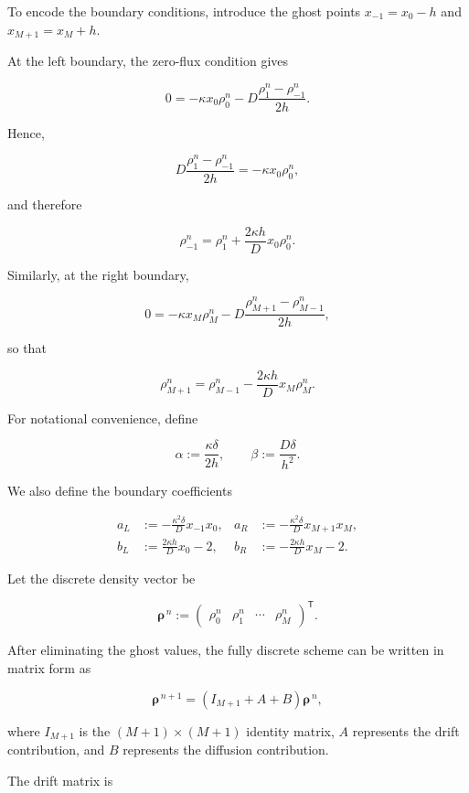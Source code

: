 \documentclass{article}
\begin{document}
To encode the boundary conditions, introduce the ghost points
$x_{-1}=x_0-h$ and $x_{M+1}=x_M+h$.

At the left boundary, the zero-flux condition gives

$$
0
=
-\kappa x_0\rho_0^n
-
D\frac{\rho_1^n-\rho_{-1}^n}{2h}.
$$

Hence,

$$
D\frac{\rho_1^n-\rho_{-1}^n}{2h}
=
-\kappa x_0\rho_0^n,
$$

and therefore

$$
\rho_{-1}^n
=
\rho_1^n
+
\frac{2\kappa h}{D}x_0\rho_0^n.
$$

Similarly, at the right boundary,

$$
0
=
-\kappa x_M\rho_M^n
-
D\frac{\rho_{M+1}^n-\rho_{M-1}^n}{2h},
$$

so that

$$
\rho_{M+1}^n
=
\rho_{M-1}^n
-
\frac{2\kappa h}{D}x_M\rho_M^n.
$$

For notational convenience, define

$$
\alpha
:=
\frac{\kappa\delta}{2h},
\qquad
\beta
:=
\frac{D\delta}{h^2}.
$$

We also define the boundary coefficients

$$
\begin{aligned}
a_L
&:=
-\frac{\kappa^2\delta}{D}x_{-1}x_0,
&
a_R
&:=
-\frac{\kappa^2\delta}{D}x_{M+1}x_M,
\\[6pt]
b_L
&:=
\frac{2\kappa h}{D}x_0-2,
&
b_R
&:=
-\frac{2\kappa h}{D}x_M-2.
\end{aligned}
$$

Let the discrete density vector be

$$
\boldsymbol{\rho}^{\,n}
:=
\begin{pmatrix}
\rho_0^n &
\rho_1^n &
\cdots &
\rho_M^n
\end{pmatrix}^{\mathsf T}.
$$

After eliminating the ghost values, the fully discrete scheme can be
written in matrix form as

$$
\boldsymbol{\rho}^{\,n+1}
=
\left(
I_{M+1}+A+B
\right)
\boldsymbol{\rho}^{\,n},
$$

where $I_{M+1}$ is the $(M+1)\times(M+1)$ identity matrix,
$A$ represents the drift contribution, and $B$ represents the
diffusion contribution.

\begingroup

\renewcommand{\arraystretch}{1.3}
\setlength{\arraycolsep}{7pt}

The drift matrix is
\end{document}

